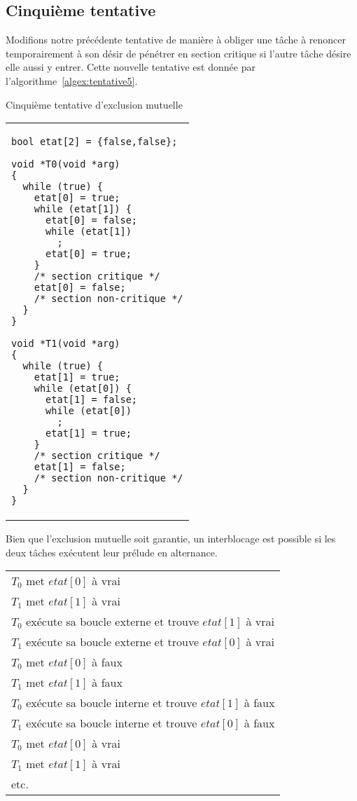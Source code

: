 \subsection*{Cinquième tentative}
Modifions notre précédente tentative de manière à obliger une tâche à renoncer temporairement à son désir de pénétrer en section critique si l'autre tâche désire elle aussi y entrer.
Cette nouvelle tentative est donnée par l'algorithme~\ref{algex:tentative5}.
\begin{algorithm}[!ht]
  \caption{Cinquième tentative d'exclusion mutuelle}\label{algex:tentative5}
  \centering
  \begin{tabular}{l}
    \lstset{language=C++}
    \begin{lstlisting}
bool etat[2] = {false,false};

void *T0(void *arg)
{
  while (true) {
    etat[0] = true;
    while (etat[1]) {
      etat[0] = false;
      while (etat[1])
        ;
      etat[0] = true;
    }
    /* section critique */
    etat[0] = false;
    /* section non-critique */
  }
}

void *T1(void *arg)
{
  while (true) {
    etat[1] = true;
    while (etat[0]) {
      etat[1] = false;
      while (etat[0])
        ;
      etat[1] = true;
    }
    /* section critique */
    etat[1] = false;
    /* section non-critique */
  }
}
\end{lstlisting}
  \end{tabular}

\end{algorithm}

Bien que l'exclusion mutuelle soit garantie, un interblocage est possible si les deux tâches exécutent leur prélude en alternance.
\par\noindent
\centering
\begin{tabular}{l}
  $T_0$ met $etat[0]$ à vrai                                 \\
  $T_1$ met $etat[1]$ à vrai                                 \\
  $T_0$ exécute sa boucle externe et trouve $etat[1]$ à vrai \\
  $T_1$ exécute sa boucle externe et trouve $etat[0]$ à vrai \\
  $T_0$ met $etat[0]$ à faux                                 \\
  $T_1$ met $etat[1]$ à faux                                 \\
  $T_0$ exécute sa boucle interne et trouve $etat[1]$ à faux \\
  $T_1$ exécute sa boucle interne et trouve $etat[0]$ à faux \\
  $T_0$ met $etat[0]$ à vrai                                 \\
  $T_1$ met $etat[1]$ à vrai                                 \\
  etc.                                                       \\
\end{tabular}

